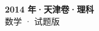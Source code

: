 \documentclass[zihao=-4, a4paper]{ctexart}
\begin{document}
\begin{center}
  {\Large\bfseries 2014 年·天津卷·理科}\\[4pt]
  {\large 数学 · 试题版}
\end{center}
\medskip
{}

\end{document}
